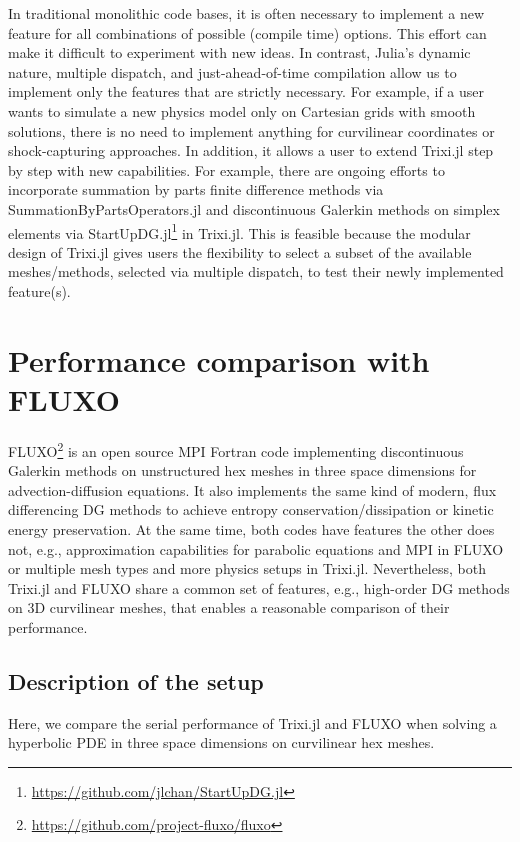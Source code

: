 \documentclass{juliacon}
\makeatletter
\newcommand{\eg}[0]{{e.g.\@}\xspace}
\newcommand{\trixi}{Trixi.jl\xspace}
\makeatother
\begin{document}
In traditional monolithic code bases, it is often necessary to implement a new
feature for all combinations of possible (compile time) options. This effort
can make it difficult to experiment with new ideas. In contrast, Julia's dynamic
nature, multiple dispatch, and just-ahead-of-time compilation allow us to implement only the features
that are strictly necessary. For example, if a user wants to simulate a new
physics model only on Cartesian grids with smooth solutions, there is no need
to implement anything for curvilinear coordinates or shock-capturing approaches.
In addition, it allows a user to extend \trixi step by step with new capabilities.
For example, there are ongoing efforts to incorporate summation by parts finite
difference methods via SummationByPartsOperators.jl \cite{ranocha2021sbp} and
discontinuous Galerkin methods on simplex elements via StartUpDG.jl\footnote{\url{https://github.com/jlchan/StartUpDG.jl}} in \trixi.
This is feasible because the modular design of \trixi gives users the flexibility to select
a subset of the available meshes/methods, selected via multiple dispatch,
to test their newly implemented feature(s).



\section{Performance comparison with FLUXO}
\label{sec:performance-comparison}

FLUXO\footnote{\url{https://github.com/project-fluxo/fluxo}} is an open source
MPI Fortran code implementing discontinuous Galerkin methods on unstructured hex
meshes in three space dimensions for advection-diffusion equations. It also
implements the same kind of modern, flux differencing DG methods
to achieve entropy conservation/dissipation or kinetic energy preservation.
At the same time, both codes have features the other does not, \eg,
approximation capabilities for parabolic equations and MPI in FLUXO
or multiple mesh types and more physics setups in \trixi. Nevertheless,
both \trixi and FLUXO share a common set of features, \eg, high-order DG
methods on 3D curvilinear meshes, that enables a reasonable comparison of their performance.


\subsection{Description of the setup}

Here, we compare the serial performance of \trixi and FLUXO when solving a
hyperbolic PDE in three space dimensions on curvilinear hex meshes.
\end{document}
